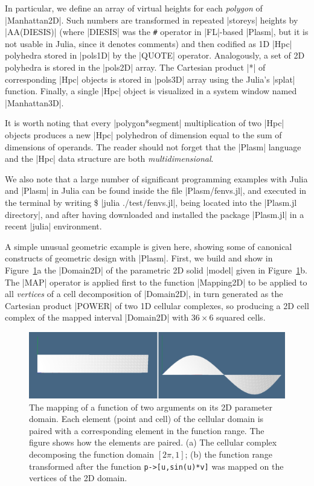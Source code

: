 \begin{script}
\begin{coding}
In particular, we define an array of virtual heights for each \emph{polygon} of |Manhattan2D|. Such numbers are transformed in repeated |storeys| heights by 
|AA(DIESIS)| (where |DIESIS| was the \texttt{\#} operator in |FL|-based |Plasm|, but it is not usable in Julia, since it denotes comments) and then codified as 1D |Hpc| polyhedra stored in |pols1D| by the |QUOTE| operator. Analogously, a set of 2D polyhedra is stored in the |pols2D| array. The Cartesian product |*| of corresponding |Hpc| objects is stored in |pols3D| array using the Julia’s |splat| function. Finally, a single |Hpc| object is visualized in a system window named |Manhattan3D|. 

It is worth noting that every |polygon*segment| multiplication of two |Hpc| objects produces a new |Hpc| polyhedron of dimension equal to the sum of dimensions of operands.
The reader should not forget that the |Plasm| language and the |Hpc| data structure are both  \emph{multidimensional}.
\end{coding}

We also note that a large number of significant programming examples with Julia and |Plasm| in Julia can be found inside the file |Plasm/fenvs.jl|, and executed in the terminal by writing \$ |julia ./test/fenvs.jl|, being located into the |Plasm.jl directory|, and after having downloaded and installed the package |Plasm.jl| in a recent |julia| environment.



\begin{coding}
A simple unusual geometric example is given here, showing some of canonical constructs of geometric design with |Plasm|. First, we build and show in Figure~\ref{fig:2:sinmapping}a the  |Domain2D| of the parametric 2D solid |model| given in Figure~\ref{fig:2:sinmapping}b.  The |MAP| operator is applied first to the function |Mapping2D| to be applied to all \emph{vertices} of a cell decomposition of |Domain2D|, in turn generated as the Cartesian product |POWER| of two 1D cellular complexes, so producing a 2D cell complex of the mapped interval |Domain2D| with $36\times 6$ squared cells.


\begin{figure}[htbp]
\includegraphics[width=\textwidth]{chapter-01/figs/functionmap} 
\caption{The mapping of a function of two arguments on its 2D parameter domain. Each element (point and cell) of the cellular domain is paired with a corresponding element in the function range. The figure shows how the elements are paired. (a) The cellular complex decomposing the function domain $[2\pi,1]$; (b) the function range transformed after the function \texttt{p->[u,sin(u)*v]} was mapped on the vertices of the 2D domain. }
\label{fig:2:sinmapping}
\end{figure}



\end{coding}
\end{script}

